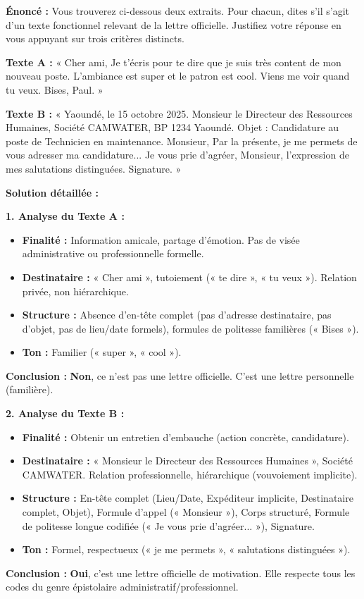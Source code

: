 \documentclass[11pt]{article}
\newcommand{\cle}[1]{{\popxbold\color{popdark}#1}}
\begin{document}
\begin{exoresolu}
    \textbf{Énoncé :} Vous trouverez ci-dessous deux extraits. Pour chacun, dites s'il s'agit d'un texte fonctionnel relevant de la lettre officielle. Justifiez votre réponse en vous appuyant sur trois critères distincts.

    \textbf{Texte A :} « Cher ami, Je t'écris pour te dire que je suis très content de mon nouveau poste. L'ambiance est super et le patron est cool. Viens me voir quand tu veux. Bises, Paul. »

    \textbf{Texte B :} « Yaoundé, le 15 octobre 2025. Monsieur le Directeur des Ressources Humaines, Société CAMWATER, BP 1234 Yaoundé. Objet : Candidature au poste de Technicien en maintenance. Monsieur, Par la présente, je me permets de vous adresser ma candidature... Je vous prie d'agréer, Monsieur, l'expression de mes salutations distinguées. Signature. »

    \tcblower
    \textbf{Solution détaillée :}

    \textbf{1. Analyse du Texte A :}
    \begin{itemize}
        \item \textbf{Finalité :} Information amicale, partage d'émotion. Pas de visée administrative ou professionnelle formelle.
        \item \textbf{Destinataire :} « Cher ami », tutoiement (« te dire », « tu veux »). Relation privée, non hiérarchique.
        \item \textbf{Structure :} Absence d'en-tête complet (pas d'adresse destinataire, pas d'objet, pas de lieu/date formels), formules de politesse familières (« Bises »).
        \item \textbf{Ton :} Familier (« super », « cool »).
    \end{itemize}
    \textbf{Conclusion :} \textbf{Non}, ce n'est pas une lettre officielle. C'est une \cle{lettre personnelle (familière)}.

    \textbf{2. Analyse du Texte B :}
    \begin{itemize}
        \item \textbf{Finalité :} Obtenir un entretien d'embauche (action concrète, candidature).
        \item \textbf{Destinataire :} « Monsieur le Directeur des Ressources Humaines », Société CAMWATER. Relation professionnelle, hiérarchique (vouvoiement implicite).
        \item \textbf{Structure :} En-tête complet (Lieu/Date, Expéditeur implicite, Destinataire complet, Objet), Formule d'appel (« Monsieur »), Corps structuré, Formule de politesse longue codifiée (« Je vous prie d'agréer... »), Signature.
        \item \textbf{Ton :} Formel, respectueux (« je me permets », « salutations distinguées »).
    \end{itemize}
    \textbf{Conclusion :} \textbf{Oui}, c'est une \cle{lettre officielle de motivation}. Elle respecte tous les codes du genre épistolaire administratif/professionnel.
\end{exoresolu}
\end{document}
